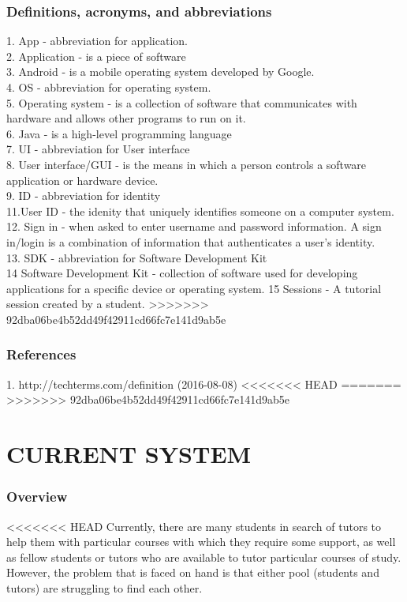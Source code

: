 \documentclass[12pt]{article}
\begin{document}
\subsubsection{Definitions, acronyms, and abbreviations}
1. App - abbreviation for application. \\
2. Application - is a piece of software \\
3. Android - is a mobile operating system developed by Google. \\
4. OS - abbreviation for operating system.\\
5. Operating system - is a collection of software that communicates with hardware and allows other programs to run on it.\\
6. Java - is a high-level programming language\\
7. UI - abbreviation for User interface\\
8. User interface/GUI - is the means in which a person controls a software application or hardware device.\\
9. ID - abbreviation for identity\\
11.User ID - the idenity that uniquely identifies someone on a computer system.\\
12. Sign in - when asked to enter username and password information. A sign in/login is a combination of information that authenticates a user's identity. \\
13. SDK - abbreviation for Software Development Kit\\
14 Software Development Kit -  collection of software used for developing applications for a specific device or operating system.
15 Sessions - A tutorial session created by a student.
>>>>>>> 92dba06be4b52dd49f42911cd66fc7e141d9ab5e

\subsubsection{References}
1. http://techterms.com/definition (2016-08-08)
<<<<<<< HEAD
=======
\newpage
>>>>>>> 92dba06be4b52dd49f42911cd66fc7e141d9ab5e

\section{CURRENT SYSTEM}
\subsubsection{Overview}
\begin{flushleft}
<<<<<<< HEAD
Currently, there are many students in search of tutors to help them with particular courses with which they require some support, as well as fellow students or tutors who are available to tutor particular courses of study. However, the problem that is faced on hand is that either pool (students and tutors) are struggling to find each other. 
\end{flushleft}
\end{document}
